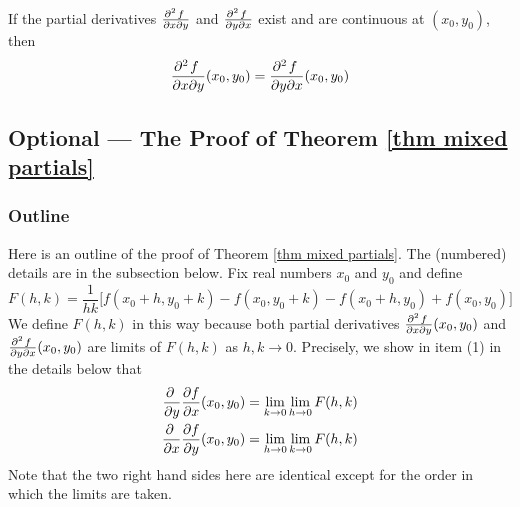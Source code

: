 
\begin{theorem}
   \label{thm mixed partials}
If the partial derivatives 
$\frac{\partial^2\hfil f\hfil\,}{\partial x\partial y}$ and 
$\frac{\partial^2\hfil f\hfil\,}{\partial y\partial x}$ exist 
and are continuous at $(x_0,y_0)$, then
$$
\frac{\partial^2\hfil f\hfil\,}{\partial x\partial y}(x_0,y_0)
=\frac{\partial^2\hfil f\hfil\,}{\partial y\partial x}(x_0,y_0)
$$
\end{theorem}

\subsection{Optional --- The Proof of Theorem \ref{thm mixed partials}}
\label{subsec mixed partial proof}

\subsubsection{Outline} 
Here is an outline of the proof of Theorem \ref{thm mixed partials}.
The (numbered) details are in the subsection below.
Fix real numbers $x_0$ and $y_0$ and define 
\begin{equation*}
F(h,k)
=\frac{1}{hk}\big[f(x_0+h,y_0+k)-f(x_0,y_0+k)-f(x_0+h,y_0)+f(x_0,y_0)\big]
\end{equation*}
We define $F(h,k)$ in this way because both partial derivatives
$\frac{\partial^2\hfil f\hfil\,}{\partial x\partial y}(x_0,y_0)$ and
$\frac{\partial^2\hfil f\hfil\,}{\partial y\partial x}(x_0,y_0)$ are  
limits of $F(h,k)$ as $h,k\rightarrow 0$. Precisely, we show in item (1)
in the details below that
\begin{align*}
\pdiff{}{y}
\pdiff{f}{x}(x_0,y_0)
     &= \lim_{k\rightarrow 0}\lim_{h\rightarrow 0}F(h,k) \\
\pdiff{}{x}
\pdiff{f}{y}(x_0,y_0)
&= \lim_{h\rightarrow 0}\lim_{k\rightarrow 0}F(h,k)
\end{align*}
Note that the two right hand sides here are identical except for the 
order in which the limits are taken.

